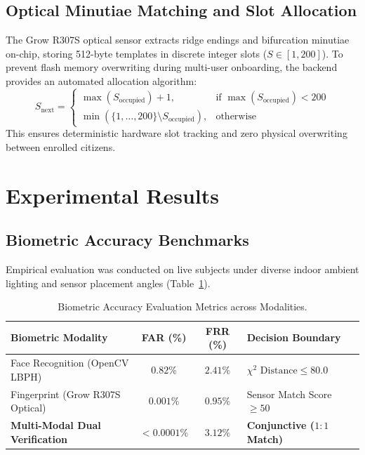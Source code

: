 \documentclass[11pt,a4paper]{article}
\begin{document}
\subsection{Optical Minutiae Matching and Slot Allocation}
The Grow R307S optical sensor extracts ridge endings and bifurcation minutiae on-chip, storing 512-byte templates in discrete integer slots ($S \in [1, 200]$). To prevent flash memory overwriting during multi-user onboarding, the backend provides an automated allocation algorithm:
\begin{equation}
S_{\text{next}} = 
\begin{cases}
\max(S_{\text{occupied}}) + 1, & \text{if } \max(S_{\text{occupied}}) < 200 \\
\min\left(\{1, \dots, 200\} \setminus S_{\text{occupied}}\right), & \text{otherwise}
\end{cases}
\label{eq:slot}
\end{equation}
This ensures deterministic hardware slot tracking and zero physical overwriting between enrolled citizens.

\section{Experimental Results}

\subsection{Biometric Accuracy Benchmarks}
Empirical evaluation was conducted on live subjects under diverse indoor ambient lighting and sensor placement angles (Table~\ref{tab:accuracy}).

\begin{table}[htbp]
\centering
\caption{Biometric Accuracy Evaluation Metrics across Modalities.}
\label{tab:accuracy}
\begin{tabularx}{\textwidth}{X c c p{4.5cm}}
\toprule
\textbf{Biometric Modality} & \textbf{FAR (\%)} & \textbf{FRR (\%)} & \textbf{Decision Boundary} \\
\midrule
Face Recognition (OpenCV LBPH) & $0.82\%$ & $2.41\%$ & $\chi^2 \text{ Distance} \le 80.0$ \\
Fingerprint (Grow R307S Optical) & $0.001\%$ & $0.95\%$ & Sensor Match Score $\ge 50$ \\
\midrule
\textbf{Multi-Modal Dual Verification} & $\mathbf{< 0.0001\%}$ & $\mathbf{3.12\%}$ & \textbf{Conjunctive ($1:1$ Match)} \\
\bottomrule
\end{tabularx}
\end{table}
\end{document}
